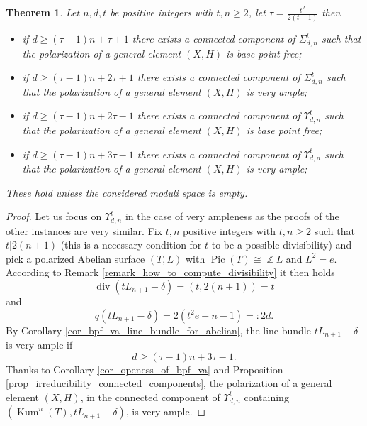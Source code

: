 \documentclass{article}
\DeclareMathOperator{\bZ}{\mathbb{Z}}
\DeclareMathOperator{\Pic}{Pic}
\DeclareMathOperator{\Kum}{Kum}
\DeclareMathOperator{\Div}{div}
\newtheorem{theorem}[proposition]{Theorem}
\begin{document}
\begin{theorem}\label{theo_general_in_connected_component}
    Let $n,d,t$ be positive integers with $t,n\geq 2$, let $\tau =\frac{t^2}{2(t-1)}$ then
    \begin{itemize}
        \item if $d\geq (\tau-1)n+\tau+1$ there exists a connected component of $\Sigma_{d,n}^t$ such that the polarization of a general element $(X,H)$ is base point free;
        \item if $d\geq (\tau-1)n+2\tau+1$ there exists a connected component of $\Sigma_{d,n}^t$ such that the polarization of a general element $(X,H)$ is very ample;
        \item if $d\geq (\tau-1)n+2\tau-1$ there exists a connected component of $\Upsilon_{d,n}^t$ such that the polarization of a general element $(X,H)$ is base point free;
        \item if $d\geq (\tau-1)n+3\tau-1$ there exists a connected component of $\Upsilon_{d,n}^t$ such that the polarization of a general element $(X,H)$ is very ample;
    \end{itemize}
These hold unless the considered moduli space is empty.
\end{theorem}

\begin{proof}
    Let us focus on $\Upsilon_{d,n}^t$ in the case of very ampleness as the proofs of the other instances are very similar. Fix $t,n$ positive integers with $t,n\geq 2$ such that $t|2(n+1)$ (this is a necessary condition for $t$ to be a possible divisibility) and pick a polarized Abelian surface $(T,L)$ with $\Pic(T)\cong \bZ L$ and $L^2=e$. According to Remark \ref{remark_how_to_compute_divisibility} it then holds $$\Div(tL_{n+1}-\delta)=(t,2(n+1))=t$$
    and $$q(tL_{n+1}-\delta)=2\left(t^2e-n-1\right)=:2d.$$
By Corollary \ref{cor_bpf_va_line_bundle_for_abelian}, the line bundle $tL_{n+1}-\delta$ is very ample if $$d\geq (\tau-1)n+3\tau-1.$$
Thanks to Corollary \ref{cor_openess_of_bpf_va} and Proposition \ref{prop_irreducibility_connected_components}, the polarization of a general element $(X,H)$, in the connected component of $\Upsilon_{d,n}^t$ containing $(\Kum^n(T),tL_{n+1}-\delta)$, is very ample.
    \end{proof}
\end{document}
